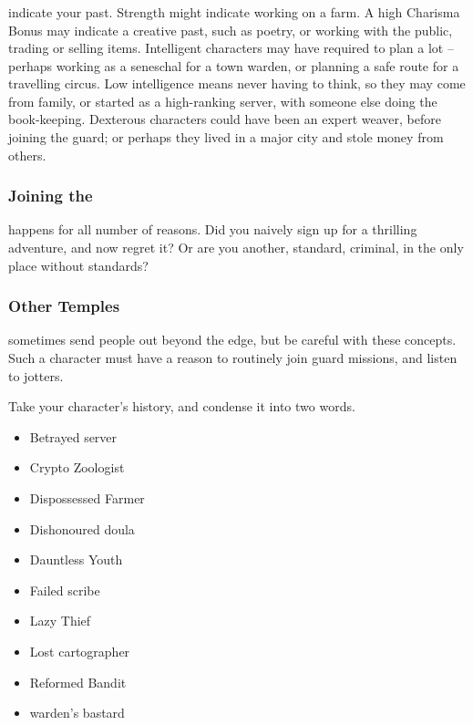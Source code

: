 \begin{multicols}{2}
\subsubsection{}
indicate your past.
Strength might indicate working on a farm.
A high Charisma Bonus may indicate a creative past, such as poetry, or working with the public, trading or selling items.
Intelligent characters may have required to plan a lot -- perhaps working as a seneschal for a town \gls{warden}, or planning a safe route for a travelling circus.
Low intelligence means never having to think, so they may come from  family, or started as a high-ranking \gls{server}, with someone else doing the book-keeping.
Dexterous characters could have been an expert weaver, before joining the \gls{guard}; or perhaps they lived in a major city and stole money from others.

\subsubsection{Joining the }
happens for all number of reasons.
Did you naively sign up for a thrilling adventure, and now regret it?
Or are you another, standard, criminal, in the only place without standards?

\subsubsection{Other Temples}
sometimes send people out beyond the \gls{edge}, but be careful with these concepts.
Such a character must have a reason to routinely join \gls{guard} missions, and listen to \glspl{jotter}.

Take your character's history, and condense it into two words.

\begin{multicols}{2}
\begin{itemize}
  \item
  Betrayed \Gls{server}
  \item
  Crypto Zoologist
  \item
  Dispossessed Farmer
  \item
  Dishonoured \Gls{doula}
  \item
  Dauntless Youth
  \item
  Failed \Gls{scribe}
  \item
  Lazy Thief
  \item
  Lost \Gls{cartographer}
  \item
  Reformed Bandit
  \item
  \Gls{warden}'s bastard
\end{itemize}
\end{multicols}

\end{multicols}

